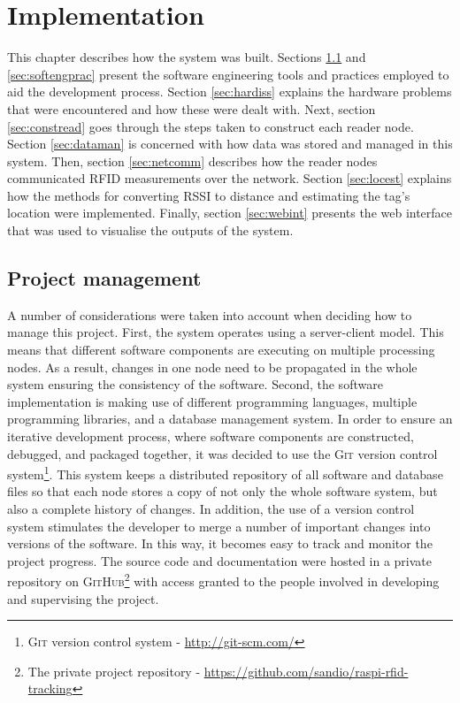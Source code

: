 \chapter{Implementation}
\label{ch:implementation}

This chapter describes how the system was built. Sections \ref{sec:projman} and \ref{sec:softengprac} present the software engineering tools and practices employed to aid the development process. Section \ref{sec:hardiss} explains the hardware problems that were encountered and how these were dealt with. Next, section \ref{sec:constread} goes through the steps taken to construct each reader node. Section \ref{sec:dataman} is concerned with how data was stored and managed in this system. Then, section \ref{sec:netcomm} describes how the reader nodes communicated RFID measurements over the network. Section \ref{sec:locest} explains how the methods for converting RSSI to distance and estimating the tag's location were implemented. Finally, section \ref{sec:webint} presents the web interface that was used to visualise the outputs of the system.

\section{Project management}
\label{sec:projman}

A number of considerations were taken into account when deciding how to manage this project. First, the system operates using a server-client model. This means that different software components are executing on multiple processing nodes. As a result, changes in one node need to be propagated in the whole system ensuring the consistency of the software.  Second, the software implementation is making use of different programming languages, multiple programming libraries, and a database management system. In order to ensure an iterative development process, where software components are constructed, debugged, and packaged together, it was decided to use the \textsc{Git} version control system\footnote{\textsc{Git} version control system - \url{http://git-scm.com/}}. This system keeps a distributed repository of all software and database files so that each node stores a copy of not only the whole software system, but also a complete history of changes. In addition, the use of a version control system stimulates the developer to merge a number of important changes into versions of the software. In this way, it becomes easy to track and monitor the project progress. The source code and documentation were hosted in a private repository on \textsc{GitHub}\footnote{The private project repository - \url{https://github.com/sandio/raspi-rfid-tracking}} with access granted to the people involved in developing and supervising the project.

